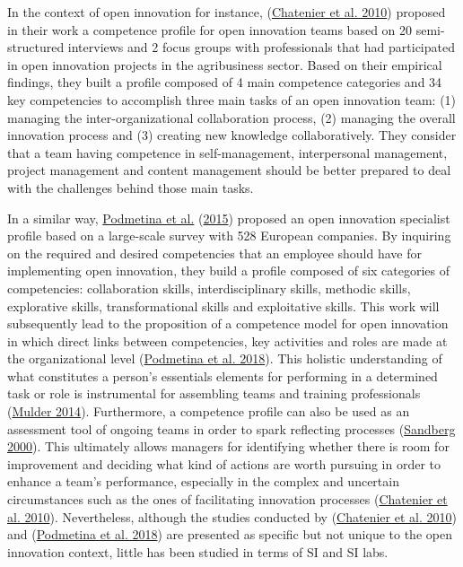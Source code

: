 \documentclass[AMA,STIX1COL,APA,STIX2COL]{WileyNJD-v2}
\begin{document}
In the context of open innovation for instance,
(\protect\hyperlink{ref-Chatenier2010}{Chatenier et al. 2010}) proposed
in their work a competence profile for open innovation teams based on 20
semi-structured interviews and 2 focus groups with professionals that
had participated in open innovation projects in the agribusiness sector.
Based on their empirical findings, they built a profile composed of 4
main competence categories and 34 key competencies to accomplish three
main tasks of an open innovation team: (1) managing the
inter-organizational collaboration process, (2) managing the overall
innovation process and (3) creating new knowledge collaboratively. They
consider that a team having competence in self-management, interpersonal
management, project management and content management should be better
prepared to deal with the challenges behind those main tasks.

In a similar way, \protect\hyperlink{ref-Podmetina2015}{Podmetina et
al.} (\protect\hyperlink{ref-Podmetina2015}{2015}) proposed an open
innovation specialist profile based on a large-scale survey with 528
European companies. By inquiring on the required and desired
competencies that an employee should have for implementing open
innovation, they build a profile composed of six categories of
competencies: collaboration skills, interdisciplinary skills, methodic
skills, explorative skills, transformational skills and exploitative
skills. This work will subsequently lead to the proposition of a
competence model for open innovation in which direct links between
competencies, key activities and roles are made at the organizational
level (\protect\hyperlink{ref-Podmetina2018}{Podmetina et al. 2018}).
This holistic understanding of what constitutes a person's essentials
elements for performing in a determined task or role is instrumental for
assembling teams and training professionals
(\protect\hyperlink{ref-Mulder2014}{Mulder 2014}). Furthermore, a
competence profile can also be used as an assessment tool of ongoing
teams in order to spark reflecting processes
(\protect\hyperlink{ref-Sandberg2000}{Sandberg 2000}). This ultimately
allows managers for identifying whether there is room for improvement
and deciding what kind of actions are worth pursuing in order to enhance
a team's performance, especially in the complex and uncertain
circumstances such as the ones of facilitating innovation processes
(\protect\hyperlink{ref-Chatenier2010}{Chatenier et al. 2010}).
Nevertheless, although the studies conducted by
(\protect\hyperlink{ref-Chatenier2010}{Chatenier et al. 2010}) and
(\protect\hyperlink{ref-Podmetina2018}{Podmetina et al. 2018}) are
presented as specific but not unique to the open innovation context,
little has been studied in terms of SI and SI labs.
\end{document}
